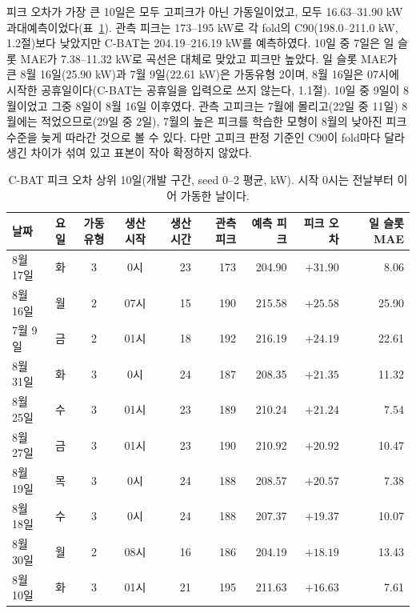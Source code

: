 피크 오차가 가장 큰 10일은 모두 고피크가 아닌 가동일이었고, 모두 16.63--31.90 kW 과대예측이었다(표~\ref{tab:ch3-worst}). 관측 피크는 173--195 kW로 각 fold의 C90(198.0--211.0 kW, 1.2절)보다 낮았지만 C-BAT는 204.19--216.19 kW를 예측하였다. 10일 중 7일은 일 슬롯 MAE가 7.38--11.32 kW로 곡선은 대체로 맞았고 피크만 높았다. 일 슬롯 MAE가 큰 8월 16일(25.90 kW)과 7월 9일(22.61 kW)은 가동유형 2이며, 8월 16일은 07시에 시작한 공휴일이다(C-BAT는 공휴일을 입력으로 쓰지 않는다, 1.1절). 10일 중 9일이 8월이었고 그중 8일이 8월 16일 이후였다. 관측 고피크는 7월에 몰리고(22일 중 11일) 8월에는 적었으므로(29일 중 2일), 7월의 높은 피크를 학습한 모형이 8월의 낮아진 피크 수준을 늦게 따라간 것으로 볼 수 있다. 다만 고피크 판정 기준인 C90이 fold마다 달라 생긴 차이가 섞여 있고 표본이 작아 확정하지 않았다.

\begin{table}[htbp]
\centering
\hwptablefont
\setlength{\tabcolsep}{4pt}
\caption{C-BAT 피크 오차 상위 10일(개발 구간, seed 0--2 평균, kW). 시작 0시는 전날부터 이어 가동한 날이다.}\label{tab:ch3-worst}
\begin{tabular}{lcccrrrrr}
\toprule
날짜 & 요일 & 가동유형 & 생산 시작 & 생산시간 & 관측 피크 & 예측 피크 & 피크 오차 & 일 슬롯 MAE \\
\midrule
8월 17일 & 화 & 3 & 0시 & 23 & 173 & 204.90 & $+31.90$ & 8.06 \\
8월 16일 & 월 & 2 & 07시 & 15 & 190 & 215.58 & $+25.58$ & 25.90 \\
7월 9일 & 금 & 2 & 01시 & 18 & 192 & 216.19 & $+24.19$ & 22.61 \\
8월 31일 & 화 & 3 & 0시 & 24 & 187 & 208.35 & $+21.35$ & 11.32 \\
8월 25일 & 수 & 3 & 01시 & 23 & 189 & 210.24 & $+21.24$ & 7.54 \\
8월 27일 & 금 & 3 & 01시 & 23 & 190 & 210.92 & $+20.92$ & 10.47 \\
8월 19일 & 목 & 3 & 0시 & 24 & 188 & 208.57 & $+20.57$ & 7.38 \\
8월 18일 & 수 & 3 & 0시 & 24 & 188 & 207.37 & $+19.37$ & 10.07 \\
8월 30일 & 월 & 2 & 08시 & 16 & 186 & 204.19 & $+18.19$ & 13.43 \\
8월 10일 & 화 & 3 & 01시 & 21 & 195 & 211.63 & $+16.63$ & 7.61 \\
\bottomrule
\end{tabular}
\end{table}

